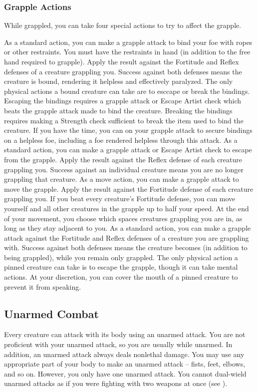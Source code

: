         \subsubsection{Grapple Actions}\label{Grapple Actions}
            While grappled, you can take four special actions to try to affect the grapple.

             As a standard action, you can make a grapple attack to bind your foe with ropes or other restraints. You must have the restraints in hand (in addition to the free hand required to grapple). Apply the result against the Fortitude and Reflex defenses of a creature grappling you. Success against both defenses means the creature is bound, rendering it helpless and effectively paralyzed. The only physical actions a bound creature can take are to esccape or break the bindings. Escaping the bindings requires a grapple attack or Escape Artist check which beats the grapple attack made to bind the creature. Breaking the bindings requires making a Strength check sufficient to break the item used to bind the creature. If you have the time, you can  on your grapple attack to secure bindings on a helpless foe, including a foe rendered helpless through this attack.
             As a standard action, you can make a grapple attack or Escape Artist check to escape from the grapple. Apply the result against the Reflex defense of each creature grappling you. Success against an individual creature means you are no longer grappling that creature.
             As a move action, you can make a grapple attack to move the grapple. Apply the result against the Fortitude defense of each creature grappling you. If you beat every creature's Fortitude defense, you can move yourself and all other creatures in the grapple up to half your speed. At the end of your movement, you choose which spaces creatures grappling you are in, as long as they stay adjacent to you.
             As a standard action, you can make a grapple attack against the Fortitude and Reflex defenses of a creature you are grappling with. Success against both defenses means the creature becomes  (in addition to being grappled), while you remain only grappled. The only physical action a pinned creature can take is to escape the grapple, though it can take mental actions. At your discretion, you can cover the mouth of a pinned creature to prevent it from speaking.

    \subsection{Unarmed Combat}\label{Unarmed Combat}
        Every creature can attack with its body using an unarmed attack.
        You are not proficient with your unarmed attack, so you are usually  while unarmed.
        In addition, an unarmed attack always deals nonlethal damage.
        You may use any appropriate part of your body to make an unarmed attack -- fists, feet, elbows, and so on.
        However, you only have one unarmed attack.
        You cannot dual-wield unarmed attacks as if you were fighting with two weapons at once (see ).

